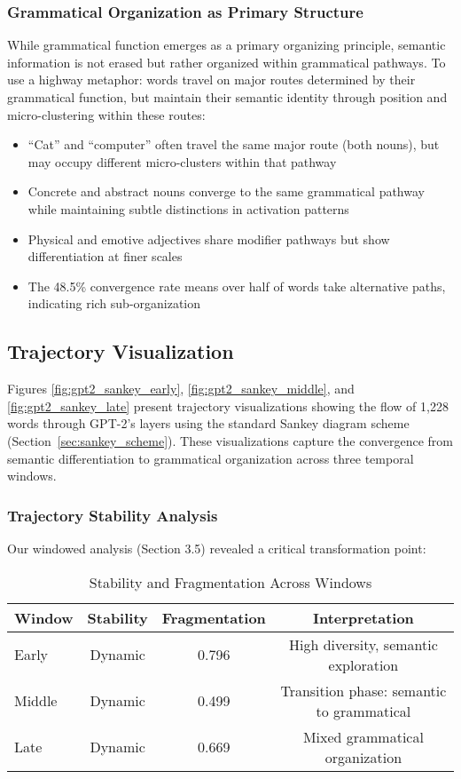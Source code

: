 \subsubsection{Grammatical Organization as Primary Structure}

While grammatical function emerges as a primary organizing principle, semantic information is not erased but rather organized within grammatical pathways. To use a highway metaphor: words travel on major routes determined by their grammatical function, but maintain their semantic identity through position and micro-clustering within these routes:
\begin{itemize}
    \item ``Cat'' and ``computer'' often travel the same major route (both nouns), but may occupy different micro-clusters within that pathway
    \item Concrete and abstract nouns converge to the same grammatical pathway while maintaining subtle distinctions in activation patterns
    \item Physical and emotive adjectives share modifier pathways but show differentiation at finer scales
    \item The 48.5\% convergence rate means over half of words take alternative paths, indicating rich sub-organization
\end{itemize}

\subsection{Trajectory Visualization}

Figures \ref{fig:gpt2_sankey_early}, \ref{fig:gpt2_sankey_middle}, and \ref{fig:gpt2_sankey_late} present trajectory visualizations showing the flow of 1,228 words through GPT-2's layers using the standard Sankey diagram scheme (Section~\ref{sec:sankey_scheme}). These visualizations capture the convergence from semantic differentiation to grammatical organization across three temporal windows.




\subsubsection{Trajectory Stability Analysis}

Our windowed analysis (Section 3.5) revealed a critical transformation point:

\begin{table}[h!]
\centering
\caption{Stability and Fragmentation Across Windows}
\label{tab:stability_analysis}
\begin{tabular}{lccc}
\toprule
Window & Stability & Fragmentation & Interpretation \\
\midrule
Early & Dynamic & 0.796 & High diversity, semantic exploration \\
Middle & Dynamic & 0.499 & Transition phase: semantic to grammatical \\
Late & Dynamic & 0.669 & Mixed grammatical organization \\
\bottomrule
\end{tabular}
\end{table}

